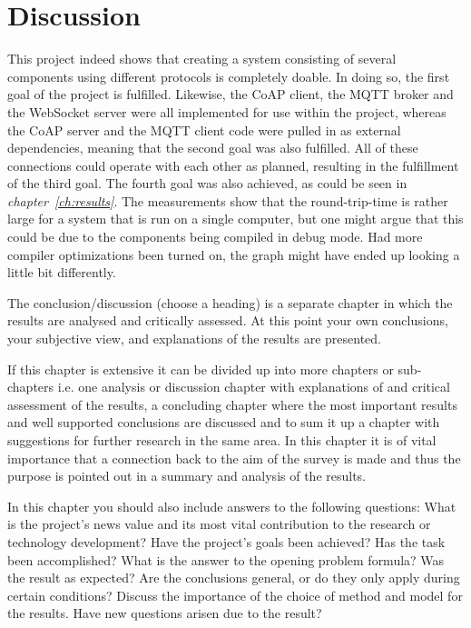 \section{Discussion}
\label{ch:concl}
\noindent	

This project indeed shows that creating a system consisting of several components using different protocols is completely doable. In doing so, the first goal of the project is fulfilled. Likewise, the CoAP client, the MQTT broker and the WebSocket server were all implemented for use within the project, whereas the CoAP server and the MQTT client code were pulled in as external dependencies, meaning that the second goal was also fulfilled. All of these connections could operate with each other as planned, resulting in the fulfillment of the third goal. The fourth goal was also achieved, as could be seen in \textit{chapter~\ref{ch:results}}. The measurements show that the round-trip-time is rather large for a system that is run on a single computer, but one might argue that this could be due to the components being compiled in debug mode. Had more compiler optimizations been turned on, the graph might have ended up looking a little bit differently.

\iffalse
The conclusion/discussion (choose a heading) is a separate chapter in which the results are analysed and critically assessed. At this point your own conclusions, your subjective view, and explanations of the results are presented.

If this chapter is extensive it can be divided up into more chapters or sub-chapters i.e. one analysis or discussion chapter with explanations of and critical assessment of the results, a concluding chapter where the most important results and well supported conclusions are discussed and to sum it up a chapter with suggestions for further research in the same area. In this chapter it is of vital importance that a connection back to the aim of the survey is made and thus the purpose is pointed out in a summary and analysis of the results. 

In this chapter you should also include answers to the following questions: What is the project's news value and its most vital contribution to the research or technology development? Have the project's goals been achieved? Has the task been accomplished? What is the answer to the opening problem formula? Was the result as expected? Are the conclusions general, or do they only apply during certain conditions? Discuss the importance of the choice of method and model for the results. Have new questions arisen due to the result?

